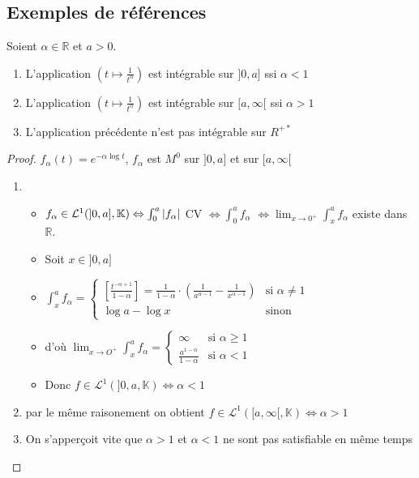 \documentclass[11pt,hidelinks]{book}
\theoremstyle{mytheoremstyle}
\theoremstyle{mytheoremstyle}
\theoremstyle{mytheoremstyle}
\theoremstyle{mytheoremstyle}
\theoremstyle{mytheoremstyle}
\theoremstyle{mytheoremstyle}
\theoremstyle{mytheoremstyle}
\theoremstyle{mytheoremstyle}
\theoremstyle{myproblemstyle}
\def\mbb#1{\mathbb{#1}}
\def\mfc#1{\mathcal{#1}}
\def\bR{\mbb{R}}
\def\LI#1{\mfc{L}^1(#1,\bK)}
\def\bK{\mbb{K}}
\newcommand{\de}[4]{\begin{cases}
    #1 & \text{si } #2 \\
    #3 & \text{si } #4
\end{cases}}
\newcommand{\deq}[3]{\begin{cases}
    #1 & \text{si } #2 \\
    #3 & \text{sinon}
\end{cases}}
\newcommand{\parenth}[1]{\left(#1\right)}
\begin{document}
    \subsection{Exemples de références}
    \begin{adjustwidth}{-2em}{-1em}
        \begin{theorem}
            Soient $\alpha \in \bR$ et $a > 0$. 
            \begin{enumerate}
            \item L'application $\parenth{t \mapsto \frac{1}{t^{\alpha}}}$ est intégrable 
            sur $]0,a]$ ssi $\alpha < 1$ 
            \item L'application $\parenth{t \mapsto \frac{1}{t^{\alpha}}}$ est intégrable sur 
            $[a,\infty[$ ssi $\alpha > 1$ 
            \item L'application précédente n'est pas intégrable sur $R^{+*}$ 
            \end{enumerate}
            \begin{proof}
                $f_{\alpha} (t) = e^{-\alpha \log t}$, $f_{\alpha}$ est $M^0$ sur 
                $]0,a]$ et sur $[a,\infty[$
                \begin{enumerate}
                    \item \begin{itemize}[label=$ $]
                     \item $f_{\alpha} \in \LI{]0,a]} \Leftrightarrow \int_{0}^{a} \abs{f_{\alpha}}$ CV
                    $\Leftrightarrow \int_{0}^{a} f_{\alpha}$
                    $\Leftrightarrow \lim_{x \to 0^+} \int_{x}^{a} f_{\alpha}$ existe dans $\bR$.
                    \item Soit $x \in ]0,a]$ 
                    \item $\int_{x}^{a} f_{\alpha}  = \deq{\left[\frac{t^{-\alpha + 1}}{1 - \alpha}\right] = \frac{1}{1 - \alpha} \cdot \parenth{\frac{1}{a^{\alpha - 1}} - \frac{1}{x^{\alpha - 1}}}}{\alpha \not=1}{\log a - \log x}$
                    \item d'où $\lim_{x \to O^+} \int_{x}^{a} f_{\alpha} = \de{\infty}{\alpha \geq 1}{\frac{a^{1 - \alpha}}{1 - \alpha}}{\alpha < 1}$
                    \item Donc $f \in \LI{]0,a} \Leftrightarrow \alpha < 1$
                    \end{itemize}
                    \item par le même raisonement on obtient $f \in \LI{[a,\infty[} \Leftrightarrow \alpha > 1$
                    \item On s'apperçoit vite que $\alpha > 1$ et $\alpha < 1$ ne sont pas satisfiable en même temps
                \end{enumerate}
                

\end{proof}
\end{theorem}
\end{adjustwidth}
\end{document}
